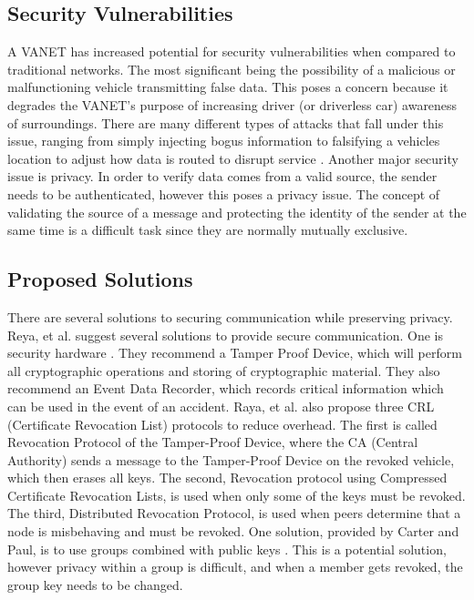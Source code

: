\documentclass {article}
\begin{document}
\subsection{Security Vulnerabilities}
A VANET has increased potential for security vulnerabilities when compared to traditional networks. The most significant being the possibility of a malicious or malfunctioning vehicle transmitting false data. This poses a concern because it degrades the VANET's purpose of increasing driver (or driverless car) awareness of surroundings. There are many different types of attacks that fall under this issue, ranging from simply injecting bogus information to falsifying a vehicles location to adjust how data is routed to disrupt service \autocite{SecVANet}. Another major security issue is privacy. In order to verify data comes from a valid source, the sender needs to be authenticated, however this poses a privacy issue. The concept of validating the source of a message and protecting the identity of the sender at the same time is a difficult task since they are normally mutually exclusive.

\subsection{Proposed Solutions}
There are several solutions to securing communication while preserving privacy. Reya, et al. suggest several solutions to provide secure communication. One is security hardware \autocite{SecVeComs}. They recommend a Tamper Proof Device, which will perform all cryptographic operations and storing of cryptographic material. They also recommend an Event Data Recorder, which records critical information which can be used in the event of an accident. Raya, et al. also propose three CRL (Certificate Revocation List) protocols to reduce overhead. The first is called Revocation Protocol of the Tamper-Proof Device, where the CA (Central Authority) sends a message to the Tamper-Proof Device on the revoked vehicle, which then erases all keys. The second, Revocation protocol using Compressed Certificate Revocation Lists, is used when only some of the keys must be revoked. The third, Distributed Revocation Protocol, is used when peers determine that a node is misbehaving and must be revoked. One solution, provided by Carter and Paul, is to use groups combined with public keys \autocite{V_BasedSecOps}. This is a potential solution, however privacy within a group is difficult, and when a member gets revoked, the group key needs to be changed. 
\end{document}
